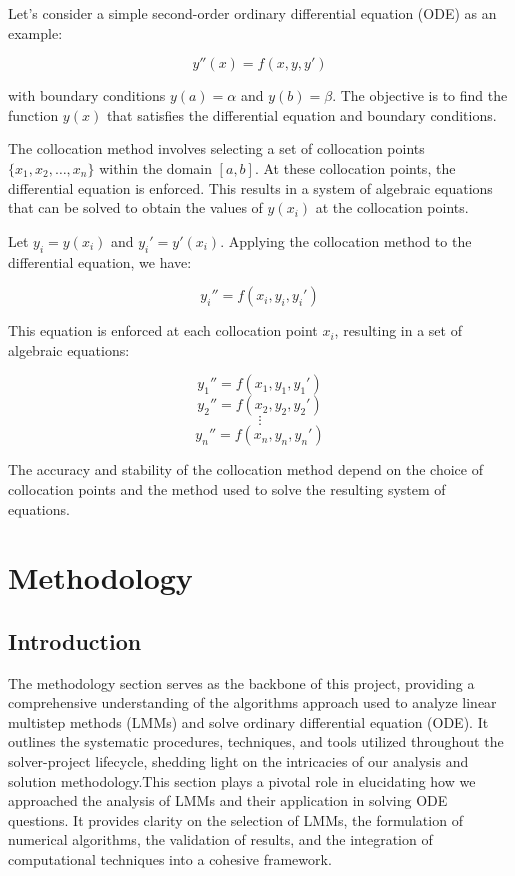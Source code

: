\documentclass[a4paper, twoside]{report} %
\begin{document}
	Let's consider a simple second-order ordinary differential equation (ODE) as an example:

	\[
	y''(x) = f(x, y, y')
	\]

	with boundary conditions \(y(a) = \alpha\) and \(y(b) = \beta\). The objective is to find the function \(y(x)\) that satisfies the differential equation and boundary conditions.

	The collocation method involves selecting a set of collocation points \(\{x_1, x_2, \ldots, x_n\}\) within the domain \([a, b]\). At these collocation points, the differential equation is enforced. This results in a system of algebraic equations that can be solved to obtain the values of \(y(x_i)\) at the collocation points.

	Let \(y_i = y(x_i)\) and \(y_i' = y'(x_i)\). Applying the collocation method to the differential equation, we have:

	\[
	y_i'' = f(x_i, y_i, y_i')
	\]

	This equation is enforced at each collocation point \(x_i\), resulting in a set of algebraic equations:

	\[
	y_1'' = f(x_1, y_1, y_1')
	\]
	\[
	y_2'' = f(x_2, y_2, y_2')
	\]
	\[
	\vdots
	\]
	\[
	y_n'' = f(x_n, y_n, y_n')
	\]

	The accuracy and stability of the collocation method depend on the choice of collocation points and the method used to solve the resulting system of equations.


	\chapter{Methodology}

	\section{Introduction}
	The methodology section serves as the backbone of this project, providing a comprehensive understanding of the algorithms approach used to analyze linear multistep methods (LMMs) and solve ordinary differential equation (ODE). It outlines the systematic procedures, techniques, and tools utilized throughout the solver-project lifecycle, shedding light on the intricacies of our analysis and solution methodology.This section plays a pivotal role in elucidating how we approached the analysis of LMMs and their application in solving ODE questions. It provides clarity on the selection of LMMs, the formulation of numerical algorithms, the validation of results, and the integration of computational techniques into a cohesive framework.
\end{document}

